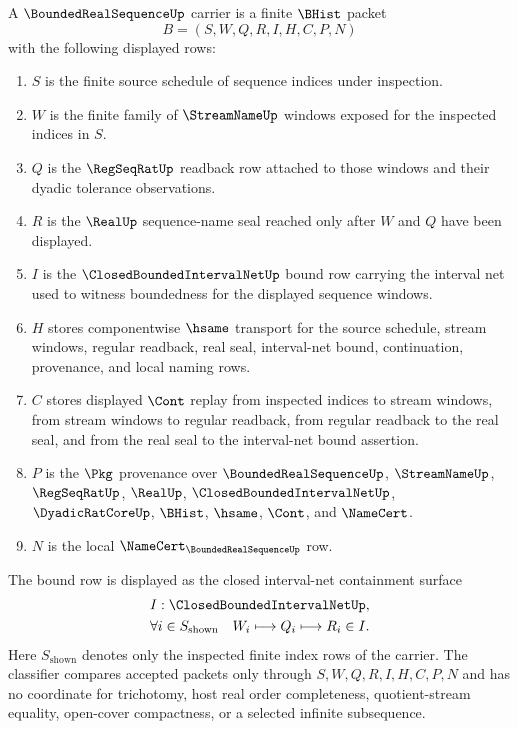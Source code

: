 \begin{definition}
\label{def:bounded-real-sequence-carrier}
A $\BoundedRealSequenceUp$ carrier is a finite $\BHist$ packet
$$
B=(S,W,Q,R,I,H,C,P,N)
$$
with the following displayed rows:
\begin{enumerate}
\item $S$ is the finite source schedule of sequence indices under inspection.
\item $W$ is the finite family of $\StreamNameUp$ windows exposed for the inspected indices in $S$.
\item $Q$ is the $\RegSeqRatUp$ readback row attached to those windows and their dyadic tolerance observations.
\item $R$ is the $\RealUp$ sequence-name seal reached only after $W$ and $Q$ have been displayed.
\item $I$ is the $\ClosedBoundedIntervalNetUp$ bound row carrying the interval net used to witness boundedness for the displayed sequence windows.
\item $H$ stores componentwise $\hsame$ transport for the source schedule, stream windows, regular readback, real seal, interval-net bound, continuation, provenance, and local naming rows.
\item $C$ stores displayed $\Cont$ replay from inspected indices to stream windows, from stream windows to regular readback, from regular readback to the real seal, and from the real seal to the interval-net bound assertion.
\item $P$ is the $\Pkg$ provenance over $\BoundedRealSequenceUp$, $\StreamNameUp$, $\RegSeqRatUp$, $\RealUp$, $\ClosedBoundedIntervalNetUp$, $\DyadicRatCoreUp$, $\BHist$, $\hsame$, $\Cont$, and $\NameCert$.
\item $N$ is the local $\NameCert_{\BoundedRealSequenceUp}$ row.
\end{enumerate}
The bound row is displayed as the closed interval-net containment surface
$$
\begin{gathered}
I:\ClosedBoundedIntervalNetUp,\\
\forall i\in S_{\mathrm{shown}}\quad W_i\longmapsto Q_i\longmapsto R_i\in I.
\end{gathered}
$$
Here $S_{\mathrm{shown}}$ denotes only the inspected finite index rows of the carrier. The classifier compares accepted packets only through $S,W,Q,R,I,H,C,P,N$ and has no coordinate for trichotomy, host real order completeness, quotient-stream equality, open-cover compactness, or a selected infinite subsequence.
\end{definition}

